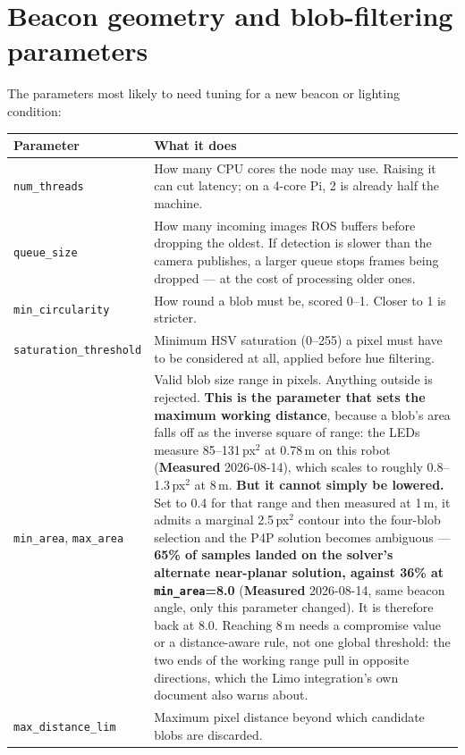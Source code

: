\documentclass[11pt]{report}
\begin{document}
\section{Beacon geometry and blob-filtering parameters}
\label{sec:beacon-params}

The parameters most likely to need tuning for a new beacon or lighting
condition:

\begin{center}
\begin{tabular}{p{}p{}}
\toprule
Parameter & What it does \\
\midrule
\texttt{num\_threads} & How many CPU cores the node may use. Raising it can cut latency; on a 4-core Pi, 2 is already half the machine. \\
\texttt{queue\_size} & How many incoming images ROS buffers before dropping the oldest. If detection is slower than the camera publishes, a larger queue stops frames being dropped --- at the cost of processing older ones. \\
\texttt{min\_circularity} & How round a blob must be, scored 0--1. Closer to 1 is stricter. \\
\texttt{saturation\_threshold} & Minimum HSV saturation (0--255) a pixel must have to be considered at all, applied before hue filtering. \\
\texttt{min\_area}, \texttt{max\_area} & Valid blob size range in pixels. Anything outside is rejected. \textbf{This is the parameter that sets the maximum working distance}, because a blob's area falls off as the inverse square of range: the LEDs measure 85--131\,px$^2$ at 0.78\,m on this robot (\textbf{Measured} 2026-08-14), which scales to roughly 0.8--1.3\,px$^2$ at 8\,m. \textbf{But it cannot simply be lowered.} Set to 0.4 for that range and then measured at 1\,m, it admits a marginal 2.5\,px$^2$ contour into the four-blob selection and the P4P solution becomes ambiguous --- \textbf{65\% of samples landed on the solver's alternate near-planar solution, against 36\% at \texttt{min\_area}=8.0} (\textbf{Measured} 2026-08-14, same beacon angle, only this parameter changed). It is therefore back at 8.0. Reaching 8\,m needs a compromise value or a distance-aware rule, not one global threshold: the two ends of the working range pull in opposite directions, which the Limo integration's own document also warns about. \\
\texttt{max\_distance\_lim} & Maximum pixel distance beyond which candidate blobs are discarded. \\

\end{tabular}
\end{center}
\end{document}
